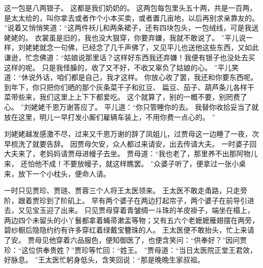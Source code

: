 这一包是八两银子。
这都是我们奶奶的。
这两包每包里头五十两，共是一百两，是太太给的，叫你拿去或者作个小本买卖，或者置几亩地，以后再别求亲靠友的。
”说着又悄悄笑道：“这两件袄儿和两条裙子，还有四块包头，一包绒线，可是我送姥姥的。
衣裳虽是旧的，我也没大狠穿，你要弃嫌，我就不敢说了。
”平儿说一样，刘姥姥就念一句佛，已经念了几千声佛了，又见平儿也送他这些东西，又如此谦逊，忙念佛道：“姑娘说那里话？这样好东西我还弃嫌！我便有银子也没处去买这样的呢。
只是我怪臊的，收了又不好，不收又辜负了姑娘的心。
”平儿笑道：“休说外话，咱们都是自己，我才这样。
你放心收了罢，我还和你要东西呢。
到年下，你只把你们晒的那个灰条菜干子和豇豆、
扁豆、茄子、葫芦条儿各样干菜带些来，我们这里上上下下都爱吃。
这个就算了，别的一概不要，别罔费了心。
”刘姥姥千恩万谢答应了。
平儿道：“你只管睡你的去。
我替你收拾妥当了就放在这里，明儿一早打发小厮们雇辆车装上，不用你费一点心的。
”\par
刘姥姥越发感激不尽，过来又千恩万谢的辞了凤姐儿，过贾母这一边睡了一夜，次早梳洗了就要告辞。
因贾母欠安，众人都过来请安，出去传请大夫。
一时婆子回大夫来了，老妈妈请贾母进幔子去坐。
贾母道：“我也老了，那里养不出那阿物儿来，
还怕他不成！不要放幔子，就这样瞧罢。
”众婆子听了，便拿过一张小桌来，放下一个小枕头，便命人请。
\par
一时只见贾珍、贾琏、贾蓉三个人将王太医领来。
王太医不敢走甬路，只走旁阶，跟着贾珍到了阶矶上。
早有两个婆子在两边打起帘子，两个婆子在前导引进去，又见宝玉迎了出来。
只见贾母穿着青皱绸一斗珠的羊皮褂子，端坐在榻上，两边四个未留头的小丫鬟都拿着蝇帚漱盂等物；又有五六个老嬷嬷雁翅摆在两旁，碧纱橱后隐隐约约有许多穿红着绿戴宝簪珠的人。
王太医便不敢抬头，忙上来请了安。
贾母见他穿着六品服色，便知御医了，也便含笑问：“供奉好？”因问贾珍：“这位供奉贵姓？”贾珍等忙回：“姓王。
”贾母道：“当日太医院正堂王君效，好脉息。
”王太医忙躬身低头，含笑回说：“那是晚晚生家叔祖。
